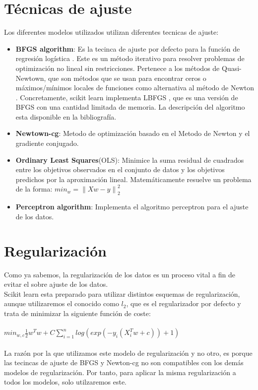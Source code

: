 \section{Técnicas de ajuste}
Los diferentes modelos utilizados utilizan diferentes tecnicas de ajuste:
\begin{itemize}
   \item \textbf{BFGS algorithm}: Es la tecinca de ajuste por defecto para la función de regresión logística \cite{linearmodels}\cite{logisticRegression}\cite{BFGS}. Este es un método iterativo para resolver problemas de optimización no lineal sin restricciones. Pertenece a los métodos de Quasi-Newtown, que son métodos que se usan para encontrar ceros o máximos/mínimos locales de funciones como alternativa al método de Newton \cite{Quasi-Newton}.
   Concretamente, scikit learn implementa LBFGS \cite{LBFGS}, que es una versión de BFGS con una cantidad limitada de memoria. La descripción del algoritmo esta disponible en la bibliografía. \cite{BFGS}\cite{LBFGS}
   \item \textbf{Newtown-cg}: Metodo de optimización basado en el Metodo de Newton \cite{Newton} y el gradiente conjugado. \cite{CG}
   \item \textbf{Ordinary Least Squares}(OLS): Minimice la suma residual de cuadrados entre los objetivos observados en el conjunto de datos y los objetivos predichos por la aproximación lineal. Matemáticamente resuelve un problema de la forma: $ min_w = \left \| Xw - y \right \|^{2}_{2} $ \cite{linearmodels}
   \item \textbf{Perceptron algorithm}: Implementa el algoritmo perceptron para el ajuste de los datos. \cite{perceptron}
\end{itemize}

\section{Regularización}
Como ya sabemos, la regularización de los datos es un proceso vital a fin de evitar el sobre ajuste de los datos.\\
Scikit learn esta preparado para utilizar distintos esquemas de regularización, aunque utilizaremos el conocido como $l_2$, que es el regularizador por defecto y trata de minimizar la siguiente función de coste:\\\\
$min_{w,c} \frac{1}{2} w^T w + C \sum_{i=1}^{n}log(exp(-y_i(X^T_iw+c))+1)$ \cite{linearmodels}\\
\\
La razón por la que utilizamos este modelo de regularización y no otro, es porque las tecincas de ajuste de BFGS y Newton-cg no son compatibles con los demás modelos de regularización. Por tanto, para aplicar la misma regularización a todos los modelos, solo utilzaremos este.\\
\newpage
